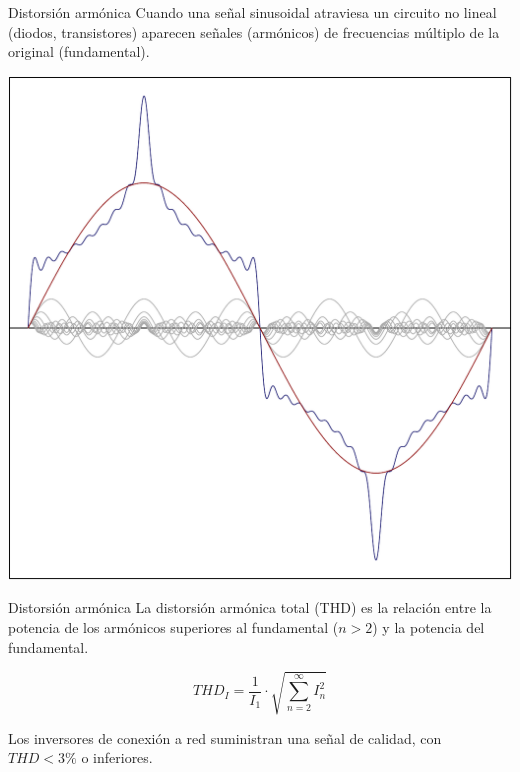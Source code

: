 \documentclass[aspectratio=169, usenames,svgnames,dvipsnames]{beamer}
\begin{document}
\begin{frame}[label={sec:org26013d1}]{Distorsión armónica}
Cuando una señal sinusoidal atraviesa un circuito no lineal (diodos, transistores) aparecen señales (armónicos) de frecuencias múltiplo de la original (fundamental).


\begin{center}
\includegraphics[height=0.6\textheight]{../figs/DistorsionArmonica.pdf}
\end{center}
\end{frame}


\begin{frame}[label={sec:org434dd17}]{Distorsión armónica}
La distorsión armónica total (THD) es la relación entre la potencia de los armónicos superiores al fundamental (\(n > 2\)) y la potencia del fundamental.

\[
  THD_I = \frac{1}{I_1} \cdot \sqrt{\sum_{n = 2}^\infty I_n^2} 
\]

Los inversores de conexión a red suministran una señal de calidad, con \(THD < 3\%\) o inferiores.
\end{frame}
\end{document}
